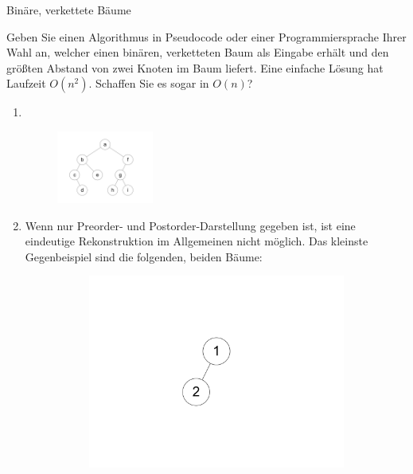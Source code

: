 \documentclass[11pt,a4paper]{article}
\begin{document}
\begin{aufgabe}{1}{Binäre, verkettete Bäume}
\begin{enumerate}
        Geben Sie einen Algorithmus in Pseudocode oder einer Programmiersprache Ihrer Wahl an, welcher einen binären, verketteten Baum als Eingabe erhält und den größten Abstand von zwei Knoten im Baum liefert.
        Eine einfache Lösung hat Laufzeit $O(n^2)$.
        Schaffen Sie es sogar in $O(n)$?
    \end{enumerate}
\end{aufgabe}
\begin{loesung}
    \begin{enumerate}
        \item \ \\
        \begin{figure}[h!]
            \centering
            \includegraphics[width=0.3\textwidth]{img/1a}
        \end{figure}
        \FloatBarrier
        \item Wenn nur Preorder- und Postorder-Darstellung gegeben ist, ist eine eindeutige Rekonstruktion im Allgemeinen nicht möglich.
        Das kleinste Gegenbeispiel sind die folgenden, beiden Bäume:
        \begin{figure}[h!]
            \centering
            \begin{subfigure}[b]{0.23\textwidth}
                \centering
                \includegraphics[width=\textwidth]{img/1b_1}

\end{subfigure}
\end{figure}
\end{enumerate}
\end{loesung}
\end{document}
